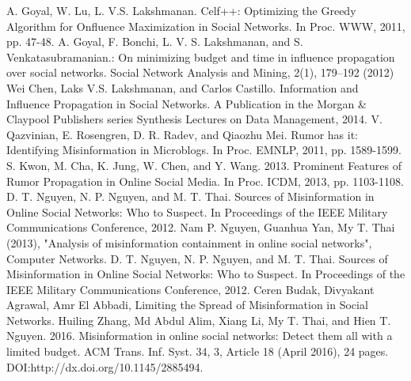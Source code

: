 \begin{thebibliography}{4}
	 A. Goyal, W. Lu, L. V.S. Lakshmanan. Celf++: Optimizing the Greedy Algorithm for Onfluence Maximization in Social Networks. In Proc. WWW, 2011, pp. 47-48.
	 A. Goyal, F. Bonchi, L. V. S. Lakshmanan, and S. Venkatasubramanian.: On minimizing budget and time in influence propagation over social networks. Social Network Analysis and Mining, 2(1), 179--192 (2012)
	 Wei Chen, Laks V.S. Lakshmanan, and Carlos Castillo. Information and Influence Propagation in Social Networks. A Publication in the Morgan \& Claypool Publishers series Synthesis Lectures on Data Management, 2014.
	 V. Qazvinian, E. Rosengren, D. R. Radev, and Qiaozhu Mei. Rumor has it: Identifying Misinformation in Microblogs. In Proc. EMNLP, 2011, pp. 1589-1599.
	 S. Kwon, M. Cha, K. Jung, W. Chen, and Y. Wang. 2013. Prominent Features of Rumor Propagation in Online Social Media. In Proc. ICDM, 2013, pp. 1103-1108.
	 D. T. Nguyen, N. P. Nguyen, and M. T. Thai. Sources of Misinformation in Online Social Networks: Who to Suspect. In Proceedings of the IEEE Military Communications Conference, 2012.
	 Nam P. Nguyen, Guanhua Yan, My T. Thai (2013), "Analysis of misinformation containment in online social networks", Computer Networks.
	 D. T. Nguyen, N. P. Nguyen, and M. T. Thai. Sources of Misinformation in Online Social Networks: Who to Suspect. In Proceedings of the IEEE Military Communications Conference, 2012.
	 Ceren Budak, Divyakant Agrawal, Amr El Abbadi, Limiting the Spread of Misinformation in Social Networks.
	 Huiling Zhang, Md Abdul Alim, Xiang Li, My T. Thai, and Hien T. Nguyen. 2016. Misinformation in online social networks: Detect them all with a limited budget. ACM Trans. Inf. Syst. 34, 3, Article 18 (April 2016), 24 pages. DOI:http://dx.doi.org/10.1145/2885494.
	

\end{thebibliography}
